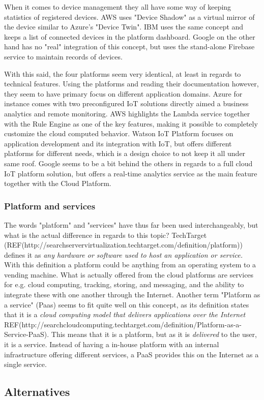 When it comes to device management they all have some way of keeping statistics of registered devices. AWS uses "Device Shadow" as a virtual mirror of the device similar to Azure's "Device Twin". IBM uses the same concept and keeps a list of connected devices in the platform dashboard. Google on the other hand has no "real" integration of this concept, but uses the stand-alone Firebase service to maintain records of devices. 

With this said, the four platforms seem very identical, at least in regards to technical features. Using the platforms and reading their documentation however, they seem to have primary focus on different application domains. Azure for instance comes with two preconfigured IoT solutions directly aimed a business analytics and remote monitoring. AWS highlights the Lambda service together with the Rule Engine as one of the key features, making it possible to completely customize the cloud computed behavior. Watson IoT Platform focuses on application development and its integration with IoT, but offers different platforms for different needs, which is a design choice to not keep it all under same roof. Google seems to be a bit behind the others in regards to a full cloud IoT platform solution, but offers a real-time analytics service as the main feature together with the Cloud Platform.


\subsubsection{Platform and services}
The words "platform" and "services" have thus far been used interchangeably, but what is the actual difference in regards to this topic? TechTarget (REF(http://searchservervirtualization.techtarget.com/definition/platform)) defines it as \textit{any hardware or software used to host an application or service.} With this definition a platform could be anything from an operating system to a vending machine. What is actually offered from the cloud platforms are services for e.g. cloud computing, tracking, storing, and messaging, and the ability to integrate these with one another through the Internet. Another term "Platform as a service" (Paas) seems to fit quite well on this concept, as its definition states that it is a \textit{cloud computing model that delivers applications over the Internet} REF(http://searchcloudcomputing.techtarget.com/definition/Platform-as-a-Service-PaaS). This means that it is a platform, but as it is \textit{delivered} to the user, it is a service. Instead of having a in-house platform with an internal infrastructure offering different services, a PaaS provides this on the Internet as a single service.

\subsection{Alternatives}
